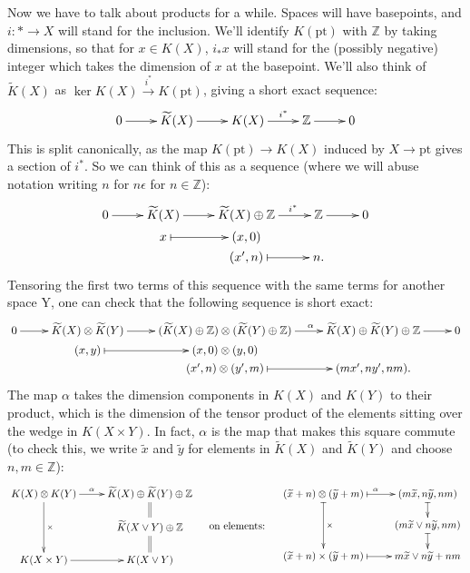 \documentclass{article}
\newcommand{\Z}{\mathbb{Z}}
\newcommand{\ptspace}{\mathrm{pt}}
\renewcommand{\to}{\longrightarrow}
\theoremstyle{definition}
\begin{document}
Now we have to talk about products for a while.  Spaces will have basepoints, and $i:*\to X$ will stand for the inclusion. We'll identify $K(\ptspace)$ with $\Z$ by taking dimensions, so that for $x\in K(X)$, $i_*x$ will stand for the (possibly negative) integer which takes the dimension of $x$ at the basepoint.  We'll also think of $\widetilde K(X)$ as $\ker K(X) \stackrel{i^*}{\to} K(\ptspace)$, giving a short exact sequence:
\[\xymatrix{
0\ar[r]&\widetilde K(X)\ar[r]& K(X)\ar[r]^{\ \ \ i^*}&\Z\ar[r]&0
}\]
This is split canonically, as the map $K(\ptspace) \to K(X)$ induced by $X \to \ptspace$ gives a section of $i^*$. So we can think of this as a sequence (where we will abuse notation writing $n$ for $n\epsilon$ for $n\in\Z$):
\[\xymatrix@R=0mm{
0\ar[r]&\widetilde K(X)\ar[r]& \widetilde K(X)\oplus\Z\ar[r]^{\ \ \ \ \ i^*}&\Z\ar[r]&0\\
&x\ar@{|->}[r]&(x,0)\\
&&(x',n)\ar@{|->}[r]&n.
}\]
Tensoring the first two terms of this sequence with the same terms for another space Y, one can check that the following sequence is short exact:%
\[\xymatrix@R=0mm{
0\ar[r]&\widetilde K(X) \otimes \widetilde K(Y)\ar[r]& (\widetilde K(X) \oplus \Z) \otimes (\widetilde K(Y) \oplus \Z)\ar[r]^{\qquad\alpha}&\widetilde K(X) \oplus \widetilde K(Y) \oplus \Z\ar[r]&0\\
&(x,y)\ar@{|->}[r]&(x,0)\otimes(y,0)\\
&&(x',n)\otimes(y',m)\ar@{|->}[r]&(mx',ny',nm).
}\]
The map $\alpha$ takes the dimension components in $K(X)$ and $K(Y)$ to their product, which is the dimension of the tensor product of the elements sitting over the wedge in $K(X \times Y)$.  In fact, $\alpha$ is the map that makes this square commute (to check this, we write $\widetilde x$ and $\widetilde y$ for elements in $\widetilde K(X)$ and $\widetilde K(Y)$ and choose $n,m\in\Z$):
\[\xymatrix@R=5mm{
K(X) \otimes K(Y)\ar[r]^{\alpha\ \ \ }\ar[dd]^\times&\widetilde K(X) \oplus \widetilde K(Y) \oplus \Z\\
&\widetilde K(X\vee Y)\oplus \Z\ar@{=}[d]\ar@{=}[u]\\
K(X\times Y)\ar[r]&K(X\vee Y)
}\ \ \ \raisebox{-1.1cm}{\text{ on elements: }}\ \ \ 
\xymatrix@R=5mm{
(\widetilde x+n) \otimes (\widetilde y+m)\ar@{|->}[r]^{\alpha\hspace{0cm}}\ar@{|->}[dd]^\times&
(m\widetilde x,n\widetilde y,nm)\ar@{|->}[d]\\
&(m\widetilde x\vee n\widetilde y,nm)\ar@{|->}[d]\\
(\widetilde x+n) \times (\widetilde y+m)\ar@{|->}[r]&m\widetilde x\vee n\widetilde y+nm
}\]
\end{document}
